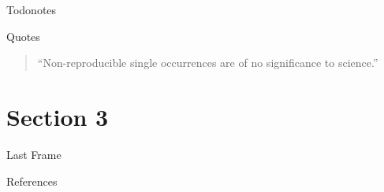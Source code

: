 \documentclass[compress,aspectratio=169]{beamer}
\begin{document}
\begin{frame}{Todonotes}
\end{frame}

\begin{frame}{Quotes}
    \vspace*{\fill}
    \begin{quote}
        \centering\Large
        \enquote{Non-reproducible single occurrences are of no significance to science.}
    \end{quote}
    \vspace{1cm}
    \hspace*{}
    \vspace*{\fill}

\end{frame}


\section{Section 3}
\begin{frame}{Last Frame}
\label{pg:lastpage} %

\end{frame}

\begin{frame}{References}
    \renewcommand*{\bibfont}{\normalfont\scriptsize}
    \printbibliography[heading=none]
\end{frame}
\end{document}
